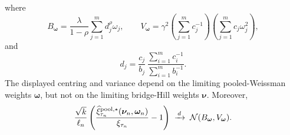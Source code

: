 \begin{conjecture}
\begin{equation}
\end{equation}
where
\[
  B_{\bm\omega}
  =
  \frac{\lambda}{1-\rho}
  \sum_{j=1}^{m}d_j^\rho\omega_j,
  \qquad
  V_{\bm\omega}
  =
  \gamma^2
  \left(\sum_{j=1}^{m}c_j^{-1}\right)
  \left(\sum_{j=1}^{m}c_j\omega_j^2\right),
\]
and
\[
	  d_j
	  =
	  \frac{c_j}{b_j}\,
	  \frac{\sum_{i=1}^{m}c_i^{-1}}{\sum_{i=1}^{m}b_i^{-1}}.
\]
The displayed centring and variance depend on the limiting pooled-Weissman
weights \(\bm\omega\), but not on the limiting bridge-Hill weights
\(\bm\nu\).
Moreover,
\begin{equation}
\label{eq:pool-ext:relative-limit}
  \frac{\sqrt{k}}{\ell_n}
  \left(
    \frac{
      \widehat\xi_{\tau_n}^{\mathrm{pool},\star}(\bm\nu_n,\bm\omega_n)
    }{\xi_{\tau_n}}
    -1
  \right)
  \;\xrightarrow{\,d\,}\;
  \mathcal N(B_{\bm\omega},V_{\bm\omega}).
\end{equation}
\end{conjecture}

